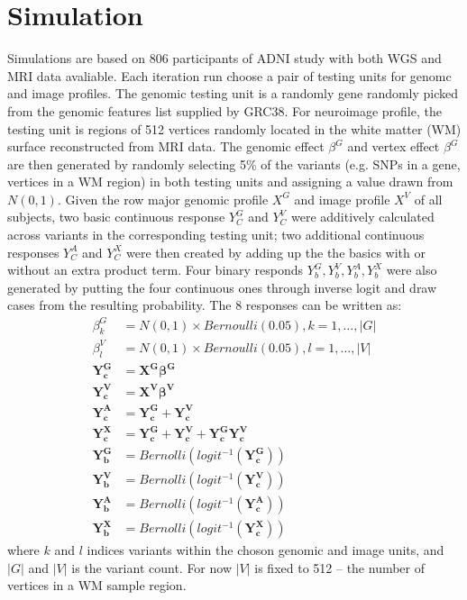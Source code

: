 \documentclass[twocolumn]{article}
\author{Xiaoran Tong}
\begin{document}
\section{Simulation}
Simulations are based on 806 participants of ADNI study with both WGS and MRI data avaliable. Each iteration run choose a pair of testing units for genomc and image profiles. The genomic testing unit is a randomly gene randomly picked from the genomic features list supplied by GRC38. For neuroimage profile, the testing unit is regions of 512 vertices randomly located in the white matter (WM) surface reconstructed from MRI data. The genomic effect $\beta^G$ and vertex effect $\beta^G$ are then generated by randomly selecting 5\% of the variants (e.g. SNPs in a gene, vertices in a WM region) in both testing units and assigning a value drawn from $N(0,1)$. Given the row major genomic profile $X^G$ and image profile $X^V$ of all subjects, two basic continuous response $Y^G_C$ and $Y^V_C$ were additively calculated across variants in the corresponding testing unit; two additional continuous responses $Y^A_C$ and $Y^X_C$ were then created by adding up the the basics with or without an extra product term. Four binary responds $Y^G_b, Y^V_b, Y^A_b, Y^X_b$ were also generated by putting the four continuous ones through inverse logit and draw cases from the resulting probability. The 8 responses can be written as:
\begin{equation*} \label{eq:SIM}
\begin{split}
  \beta^G_k &= N(0,1) \times Bernoulli(0.05), k=1, \dots, |G| \\
  \beta^V_l &= N(0,1) \times Bernoulli(0.05), l=1, \dots, |V| \\
  \boldsymbol{Y^G_c} &= \boldsymbol{X^G \beta^G} \\
  \boldsymbol{Y^V_c} &= \boldsymbol{X^V \beta^V} \\
  \boldsymbol{Y^A_c} &= \boldsymbol{Y^G_c} + \boldsymbol{Y^V_c} \\
  \boldsymbol{Y^X_c} &= \boldsymbol{Y^G_c} + \boldsymbol{Y^V_c} + \boldsymbol{Y^G_c Y^V_c} \\
  \boldsymbol{Y^G_b} &= Bernolli(logit^{-1}(\boldsymbol{Y^G_c})) \\
  \boldsymbol{Y^V_b} &= Bernolli(logit^{-1}(\boldsymbol{Y^V_c})) \\
  \boldsymbol{Y^A_b} &= Bernolli(logit^{-1}(\boldsymbol{Y^A_c})) \\
  \boldsymbol{Y^X_b} &= Bernolli(logit^{-1}(\boldsymbol{Y^X_c}))
\end{split}
\end{equation*}
where $k$ and $l$ indices variants within the choson genomic and image units, and $|G|$ and $|V|$ is the variant count. For now $|V|$ is fixed to 512 -- the number of vertices in a WM sample region.
\end{document}
